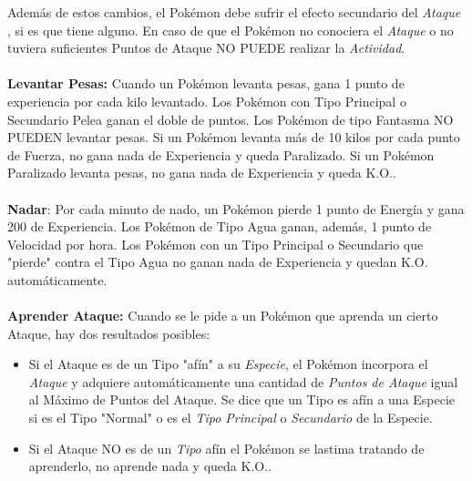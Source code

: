 \documentclass[spanish,a4paper]{article}
\begin{document}
Además de estos cambios, el Pokémon debe sufrir el efecto secundario del \textit{ Ataque }, si es que tiene alguno.
En caso de que el Pokémon no conociera el \textit{Ataque} o no tuviera suficientes Puntos de Ataque NO PUEDE realizar la \textit{Actividad}.\newline
\\\\
\textbf{Levantar Pesas:}\newline
Cuando un Pokémon levanta pesas, gana 1 punto de experiencia por cada kilo levantado.\newline
Los Pokémon con Tipo Principal o Secundario Pelea ganan el doble de puntos.\newline
Los Pokémon de tipo Fantasma NO PUEDEN levantar pesas.\newline
Si un Pokémon levanta más de 10 kilos por cada punto de Fuerza, no gana nada de Experiencia y queda Paralizado.\newline
Si un Pokémon Paralizado levanta pesas, no gana nada de Experiencia y queda K.O..\newline
\\\\

\textbf{Nadar}:\newline
Por cada minuto de nado, un Pokémon pierde 1 punto de Energía y gana 200 de Experiencia.\newline
Los Pokémon de Tipo Agua ganan, además, 1 punto de Velocidad por hora.\newline
Los Pokémon con un Tipo Principal o Secundario que "pierde" contra el Tipo Agua no ganan nada de Experiencia y quedan K.O. automáticamente.
\\\\
\textbf{Aprender Ataque:}\newline
Cuando se le pide a un Pokémon que aprenda un cierto Ataque, hay dos resultados posibles:
\begin{itemize}
 \item Si el Ataque es de un Tipo "afín" a su \textit{Especie}, el Pokémon incorpora el \textit{Ataque} y adquiere automáticamente una cantidad de \textit{Puntos de Ataque} igual al Máximo de Puntos del Ataque.
Se dice que un Tipo es afín a una Especie si es el Tipo "Normal" o es el \textit{Tipo Principal} o \textit{Secundario} de la Especie.
 \item Si el Ataque NO es de un \textit{Tipo} afín el Pokémon se lastima tratando de aprenderlo, no aprende nada y queda K.O..
\end{itemize}
\end{document}

